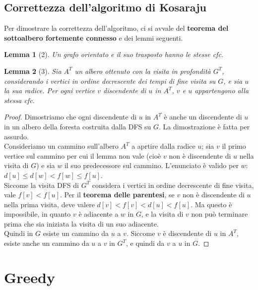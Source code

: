 \documentclass[11pt]{article}
\newtheorem*{lemma}{Lemma}
\begin{document}
\subsection*{Correttezza dell'algoritmo di Kosaraju}
Per dimostrare la correttezza dell'algoritmo, ci si avvale del \textbf{teorema del sottoalbero fortemente connesso} e dei 
lemmi seguenti.
\begin{lemma}[2]
    Un grafo orientato e il suo trasposto hanno le stesse cfc.
\end{lemma}
\begin{lemma}[3]
    Sia $A^T$ un albero ottenuto con la visita in profondità $G^T$, considerando i vertici in ordine decrescente dei tempi 
    di fine visita su $G$, e sia $u$ la sua radice. Per ogni vertice $v$ discendente di $u$ in $A^T$, $v$ e $u$ appartengono 
    alla stessa cfc.
\end{lemma}
\begin{proof}
    Dimostriamo che ogni discendente di $u$ in $A^T$ è anche un discendente di $u$ in un albero della foresta costruita 
    dalla DFS su $G$. La dimostrazione è fatta per assurdo.\\
    Consideriamo un cammino sull'albero $A^T$ a aprtire dalla radice $u$; sia $v$ il primo vertice sul cammino per cui il 
    lemma non vale (cioè $v$ non è discendente di $u$ nella visita di $G$) e sia $w$ il suo predecessore sul cammino. 
    L'enunciato è valido per $w$: $d[u]\leq d[w]<f[w]\leq f[u]$.\\
    Siccome la visita DFS di $G^T$ considera i vertici in ordine decrescente di fine visita, vale $f[v]<f[u]$.
    Per il \textbf{teorema delle parentesi}, se $v$ non è discendente di $u$ nella prima visita, deve valere $d[v]<f[v]<d[u]<f[u]$.
    Ma questo è impossibile, in quanto $v$ è adiacente a $w$ in $G$, e la visita di $v$ non può terminare prima che sia 
    iniziata la visita di un suo adiacente.\\
    Quindi in $G$ esiste un cammino da $u$ a $v$. Siccome $v$ è discendente di $u$ in $A^T$, esiste anche un cammino da 
    $u$ a $v$ in $G^T$, e quindi da $v$ a $u$ in $G$.
\end{proof}
\section*{Greedy}
\end{document}
